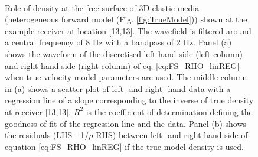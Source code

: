 \documentclass{article}
\begin{document}
	\begin{figure}[H] \centering
		\begin{subfigure}[t]{0.8\linewidth}
			\centering
		\end{subfigure}\\
		\begin{subfigure}[t]{0.8\linewidth}
			\centering
		\end{subfigure}
	\caption{Role of density at the free surface of 3D elastic media (heterogeneous forward model (Fig. \ref{fig:TrueModel})) shown at the example receiver at location [13,13]. The wavefield is filtered around a central frequency of 8 Hz with a bandpass of 2 Hz. Panel (a) shows the waveform of the discretised left-hand side (left column) and right-hand side (right column) of eq. \eqref{eq:FS_RHO_linREG} when true velocity model parameters are used. The middle column in (a) shows a scatter plot of left- and right- hand data with a regression line of a slope corresponding to the inverse of true density at receiver [13,13]. $R^{2}$ is the coefficient of determination defining the goodness of fit of the regression line and the data. Panel (b) shows the residuals (LHS - 1/$\rho$ RHS) between left- and right-hand side of equation \eqref{eq:FS_RHO_linREG} if the true model density is used.}
	\label{fig:signal_rho_ELASTIC}	
	\end{figure}
\end{document}

